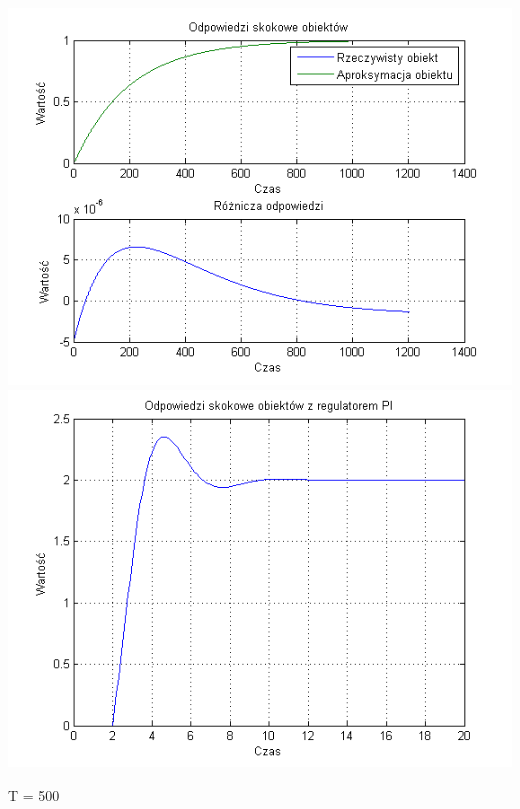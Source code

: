 \documentclass[10pt,a4paper]{article}
\begin{document}
\begin{center}
\includegraphics[scale=1]{images/jeden/skrypt_37.png}\\
\includegraphics[scale=1]{images/jeden/skrypt_38.png}\\
\end{center}
\newpage
T = 500
\end{document}

